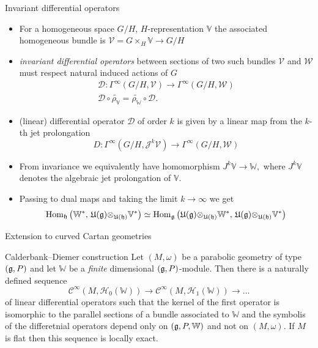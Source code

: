 \documentclass[10pt]{beamer}
\begin{document}
\begin{frame}{Invariant differential operators}
\begin{itemize}[<+- | alert@+>]
	\item For a homogeneous space $G/H$, $H$-representation $\mathbb{V}$ the associated homogeneous bundle is $\mathcal{V} = G \times_H \mathbb{V} \to G/H$
	\item \emph{invariant differential operators} between sections of two such bundles $\mathcal{V}$ and $\mathcal{W}$ must respect natural induced actions of $G$
	\begin{gather*}
\mathcal{D} \colon \Gamma^\infty(G/H, \mathcal{V}) \to \Gamma^\infty(G/H, \mathcal{W}) \\
\mathcal{D} \circ \widetilde{\rho_\mathbb{V}} =  \widetilde{\rho_\mathbb{W}} \circ \mathcal{D}.
\end{gather*}
\item (linear) differential operator $\mathcal{D}$ of order $k$ is given by a linear map from the $k$-th jet prolongation 
\[
D\colon \Gamma^\infty(G/H,\mathcal{J}^k \mathcal{V}) \to \Gamma^\infty(G/H, \mathcal{W})
\]
\item From invariance we equivalently have homomorphism $J^k \mathbb{V} \to \mathbb{W},$ where  $J^k \mathbb{V}$ denotes the algebraic jet prolongation of $\mathbb{V}.$
\item Passing to dual maps and taking the limit $k \to \infty$ we get 
\[
\mathrm{Hom}_{\mathfrak{h}}\left(\mathbb{W}^*, \, \mathfrak{U(g)\otimes_{U(h)}}\mathbb{V}^*\right) \simeq \mathrm{Hom}_{\mathfrak{g}}\left(\mathfrak{U(g)\otimes_{U(h)}}\mathbb{W}^*, \, \mathfrak{U(g)\otimes_{U(h)}}\mathbb{V}^*\right)
\]
\end{itemize}
 

\end{frame}


\begin{frame}{Extension to curved Cartan geometries}

\begin{exampleblock}{Calderbank--Diemer construction \cite{calderbank_differential_2001}}
	Let $(M, \omega)$ be a parabolic geometry of type $(\mathfrak{g}, P)$ and let $\mathbb{W}$ be a \emph{finite} dimensional $(\mathfrak{g}, P)$-module. Then there is a naturally defined sequence 
	\[
	\mathcal{C}^\infty(M, \mathcal{H}_0(\mathbb{W})) \to \mathcal{C}^\infty(M, \mathcal{H}_1(\mathbb{W})) \to \ldots
	\]
	of linear differential operators such that the kernel of the first operator is isomorphic to the parallel sections of a bundle associated to $\mathbb{W}$ and the symbolis of the differetnial operators depend only on $(\mathfrak{g}, P, \mathbb{W})$  and not on $(M, \omega)$. If $M$ is flat then this sequence is locally exact. 
\end{exampleblock}

\end{frame}
\end{document}
